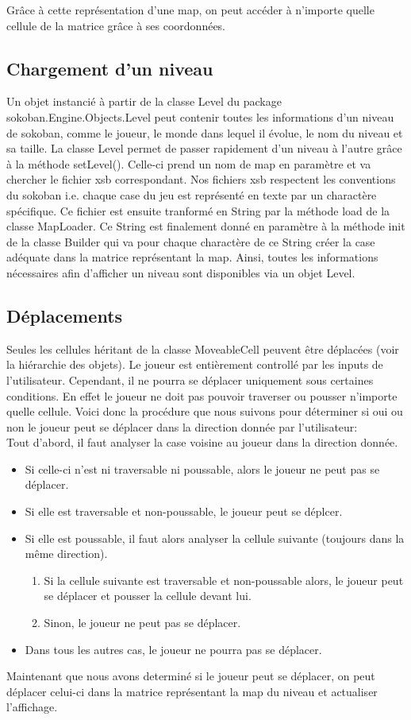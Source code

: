 \documentclass[../main.tex]{subfiles}
\begin{document}
Grâce à cette représentation d'une map, on peut accéder à n'importe quelle cellule de la matrice grâce à ses coordonnées.

\subsection{Chargement d'un niveau}
Un objet instancié à partir de la classe Level du package sokoban.Engine.Objects.Level peut contenir toutes les informations d'un niveau de sokoban,
comme le joueur, le monde dans lequel il évolue, le nom du niveau et sa taille.
La classe Level permet de passer rapidement d'un niveau à l'autre grâce à la méthode setLevel().
Celle-ci prend un nom de map en paramètre et va chercher le fichier xsb correspondant.
Nos fichiers xsb respectent les conventions du sokoban i.e. chaque case du jeu est représenté en texte par un charactère spécifique.
Ce fichier est ensuite tranformé en String par la méthode load de la classe MapLoader.
Ce String est finalement donné en paramètre à la méthode init de la classe Builder qui va pour chaque charactère de ce String créer la case adéquate dans la matrice représentant la map.
Ainsi, toutes les informations nécessaires afin d'afficher un niveau sont disponibles via un objet Level.

\subsection{Déplacements}
Seules les cellules héritant de la classe MoveableCell peuvent être déplacées (voir la hiérarchie des objets).
Le joueur est entièrement controllé par les inputs de l'utilisateur.
Cependant, il ne pourra se déplacer uniquement sous certaines conditions.
En effet le joueur ne doit pas pouvoir traverser ou pousser n'importe quelle cellule.
Voici donc la procédure que nous suivons pour déterminer si oui ou non le joueur peut se déplacer dans la direction donnée par l'utilisateur:\\
Tout d'abord, il faut analyser la case voisine au joueur dans la direction donnée.
\begin{itemize}
	\item Si celle-ci n'est ni traversable ni poussable, alors le joueur ne peut pas se déplacer.
	\item Si elle est traversable et non-poussable, le joueur peut se déplcer.
	\item Si elle est poussable, il faut alors analyser la cellule suivante (toujours dans la même direction).
		\begin{enumerate}
			\item Si la cellule suivante est traversable et non-poussable alors, le joueur peut se déplacer et pousser la cellule devant lui.
			\item Sinon, le joueur ne peut pas se déplacer.
		\end{enumerate}
	\item Dans tous les autres cas, le joueur ne pourra pas se déplacer. 
\end{itemize}
Maintenant que nous avons determiné si le joueur peut se déplacer, on peut déplacer celui-ci dans la matrice représentant la map du niveau et actualiser l'affichage.\\
\end{document}

